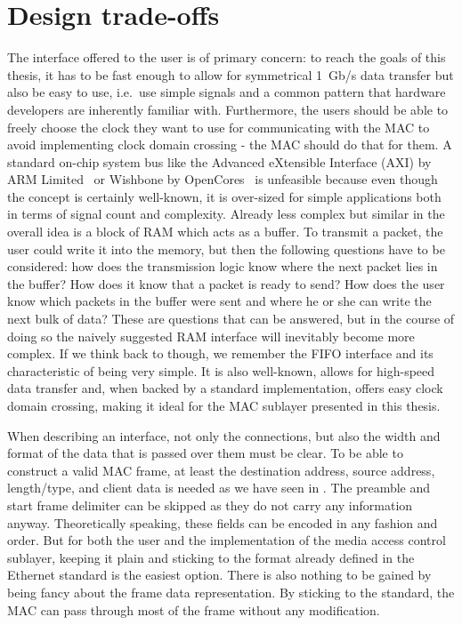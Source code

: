 \documentclass[a4paper, 11pt, oneside]{Thesis}  %
\begin{document}
\section{Design trade-offs}

The interface offered to the user is of primary concern: to reach the goals of this thesis, it has to be fast enough to allow for symmetrical 1~Gb/s data transfer but also be easy to use, i.e.\ use simple signals and a common pattern that hardware developers are inherently familiar with. Furthermore, the users should be able to freely choose the clock they want to use for communicating with the MAC to avoid implementing clock domain crossing - the MAC should do that for them. A standard on-chip system bus like the Advanced eXtensible Interface (AXI) by ARM Limited~\cite{AXI} or Wishbone by OpenCores~\cite{Wishbone} is unfeasible because even though the concept is certainly well-known, it is over-sized for simple applications both in terms of signal count and complexity. Already less complex but similar in the overall idea is a block of RAM which acts as a buffer. To transmit a packet, the user could write it into the memory, but then the following questions have to be considered: how does the transmission logic know where the next packet lies in the buffer? How does it know that a packet is ready to send? How does the user know which packets in the buffer were sent and where he or she can write the next bulk of data? These are questions that can be answered, but in the course of doing so the naively suggested RAM interface will inevitably become more complex. If we think back to  though, we remember the FIFO interface and its characteristic of being very simple. It is also well-known, allows for high-speed data transfer and, when backed by a standard implementation, offers easy clock domain crossing, making it ideal for the MAC sublayer presented in this thesis.

When describing an interface, not only the connections, but also the width and format of the data that is passed over them must be clear. To be able to construct a valid MAC frame, at least the destination address, source address, length/type, and client data is needed as we have seen in . The preamble and start frame delimiter can be skipped as they do not carry any information anyway. Theoretically speaking, these fields can be encoded in any fashion and order. But for both the user and the implementation of the media access control sublayer, keeping it plain and sticking to the format already defined in the Ethernet standard is the easiest option. There is also nothing to be gained by being fancy about the frame data representation. By sticking to the standard, the MAC can pass through most of the frame without any modification.
\end{document}

